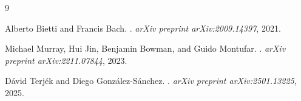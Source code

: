 \documentclass[12pt]{article}
\begin{document}

\begin{thebibliography}{9}

Alberto Bietti and Francis Bach.
.
\newblock \emph{arXiv preprint arXiv:2009.14397}, 2021.

Michael Murray, Hui Jin, Benjamin Bowman, and Guido Montufar.
.
\newblock \emph{arXiv preprint arXiv:2211.07844}, 2023.

Dávid Terjék and Diego González-Sánchez.
.
\newblock \emph{arXiv preprint arXiv:2501.13225}, 2025.

\end{thebibliography}
\end{document}

